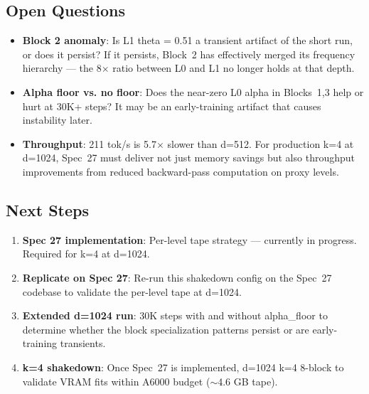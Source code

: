 \documentclass[11pt,a4paper]{article}
\begin{document}
\subsection{Open Questions}

\begin{itemize}
    \item \textbf{Block 2 anomaly}: Is L1 theta = 0.51 a transient artifact of the short run, or does it persist? If it persists, Block~2 has effectively merged its frequency hierarchy --- the 8$\times$ ratio between L0 and L1 no longer holds at that depth.
    \item \textbf{Alpha floor vs. no floor}: Does the near-zero L0 alpha in Blocks~1,3 help or hurt at 30K+ steps? It may be an early-training artifact that causes instability later.
    \item \textbf{Throughput}: 211 tok/s is 5.7$\times$ slower than d=512. For production k=4 at d=1024, Spec~27 must deliver not just memory savings but also throughput improvements from reduced backward-pass computation on proxy levels.
\end{itemize}

\subsection{Next Steps}

\begin{enumerate}
    \item \textbf{Spec 27 implementation}: Per-level tape strategy --- currently in progress. Required for k=4 at d=1024.
    \item \textbf{Replicate on Spec 27}: Re-run this shakedown config on the Spec~27 codebase to validate the per-level tape at d=1024.
    \item \textbf{Extended d=1024 run}: 30K steps with and without alpha\_floor to determine whether the block specialization patterns persist or are early-training transients.
    \item \textbf{k=4 shakedown}: Once Spec~27 is implemented, d=1024 k=4 8-block to validate VRAM fits within A6000 budget ($\sim$4.6 GB tape).
\end{enumerate}
\end{document}
